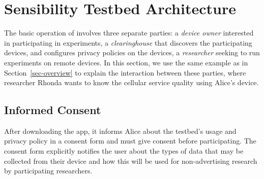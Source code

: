 \section{Sensibility Testbed Architecture}\label{sec-design}

The basic operation of \sysname involves three separate 
parties: a \textit{device owner} interested in participating in 
experiments, a \textit{clearinghouse} that discovers the
participating devices, and configures privacy policies on the 
devices,  a \textit{researcher} seeking to run experiments on 
remote devices. 
In this section, we use the same example as in 
Section~\ref{sec-overview} to explain the interaction between these 
parties, where researcher Rhonda wants to know the cellular service quality 
using Alice's device.


\subsection{Informed Consent}\label{subsec:informed-consent}

After downloading the app, it informs Alice about the testbed's usage and 
privacy policy in a consent form and must give consent before participating.
The consent form  explicitly notifies the user about the 
types of data that may be collected from their device and how this will
be used for non-advertising research by participating researchers.


